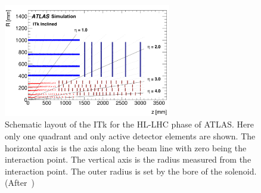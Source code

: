 \begin{figure}[!htpb]
\centering
\includegraphics[width=0.65\textwidth]{ITk_Layout.pdf}
\caption{\label{fig:ITk_Layout}Schematic layout of the ITk for the HL-LHC phase of ATLAS. Here only one quadrant and only active detector elements are shown. The horizontal axis is the axis along the beam line with zero being the interaction point. The vertical axis is the radius measured from the interaction point. The outer radius is set by the bore of the solenoid. (After~\cite{ITkStripsTDR})}
\end{figure}


